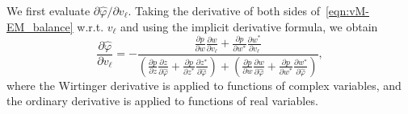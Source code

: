 \documentclass[a4paper,12pt]{article}
\begin{document}
We first evaluate $\partial \hat{\varphi}/\partial v_\ell$. Taking the derivative of both sides of~\eqref{eqn:vM-EM_balance} w.r.t. $v_\ell$ and using the implicit derivative formula, we obtain 
\begin{equation}
    \frac{\partial \hat\varphi}{\partial v_\ell}=-\frac{\frac{\partial p}{\partial w} \frac{\partial w}{\partial v_\ell}+\frac{\partial p}{\partial w^*} \frac{\partial w^*}{\partial v_\ell}}{\left(\frac{\partial p}{\partial z} \frac{\partial z}{\partial \hat\varphi}+\frac{\partial p}{\partial z^*} \frac{\partial z^*}{\partial \hat\varphi}\right)+\left(\frac{\partial p}{\partial w} \frac{\partial w}{\partial \hat\varphi}+\frac{\partial p}{\partial w^*} \frac{\partial w^*}{\partial \hat\varphi}\right)},
    \label{eqn:implicit_function_derivative} 
\end{equation}
where the Wirtinger derivative is applied to functions of complex variables, and the ordinary derivative is applied to functions of real variables. 
\end{document}
